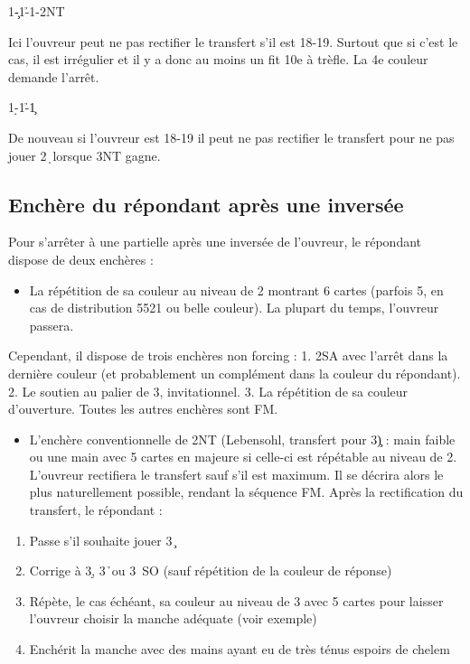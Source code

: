 \documentclass[a4paper]{article}
\begin{document}
\begin{bidtable}
1\c-1\h-1\s-2NT
\end{bidtable}

Ici l'ouvreur peut ne pas rectifier le transfert s'il est 18-19. Surtout que si c'est le cas, il est irrégulier
et il y a donc au moins un fit 10e à trèfle. La 4e couleur demande l'arrêt.

\begin{bidtable}
1\d-1\h-1\c
\end{bidtable}

De nouveau si l'ouvreur est 18-19 il peut ne pas rectifier le transfert pour ne pas jouer 2\d\ lorsque 3NT gagne.

\subsection{Enchère du répondant après une inversée}

Pour s'arrêter à une partielle après une inversée de l'ouvreur, le répondant dispose de deux enchères :

\begin{itemize}
\item La répétition de sa couleur au niveau de 2 montrant 6 cartes (parfois 5, en cas de distribution 5521 ou belle couleur).
  La plupart du temps, l'ouvreur passera.

\end{itemize}

Cependant, il dispose de trois enchères non forcing :
1. 2SA avec l'arrêt dans la dernière couleur (et probablement un complément dans la couleur du répondant).
2. Le soutien au palier de 3, invitationnel.
3. La répétition de sa couleur d'ouverture.
Toutes les autres enchères sont FM.

\begin{itemize}
\item L'enchère conventionnelle de 2NT (Lebensohl, transfert pour 3\c ) : main faible ou une main avec 5 cartes en majeure si celle-ci est répétable au niveau de 2.
L'ouvreur rectifiera le transfert sauf s'il est maximum. Il se décrira alors le plus naturellement possible, rendant la séquence FM.
Après la rectification du transfert, le répondant :

\end{itemize}

\begin{enumerate}
\item Passe s'il souhaite jouer 3\c\ 

\item Corrige à 3\d , 3\h\ ou 3\s\ SO (sauf répétition de la couleur de réponse)

\item Répète, le cas échéant, sa couleur au niveau de 3 avec 5 cartes pour laisser l'ouvreur choisir la manche adéquate (voir exemple)

\item Enchérit la manche avec des mains ayant eu de très ténus espoirs de chelem

\end{enumerate}
\end{document}
